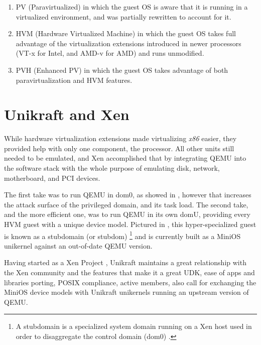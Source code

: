 \begin{enumerate}
  \item PV (Paravirtualized) in which the guest OS is aware that it is running in a virtualized environment, and was partially rewritten to account for it.
  \item HVM (Hardware Virtualized Machine) in which the guest OS takes full advantage of the virtualization extensions introduced in newer processors (VT-x for Intel, and AMD-v for AMD) and runs unmodified.
  \item PVH (Enhanced PV) in which the guest OS takes advantage of both paravirtualization and HVM features.
\end{enumerate}

\section{Unikraft and Xen}
\label{sec:unikraft-xen}

While hardware virtualization extensions made virtualizing \textit{x86} easier, they provided help with only one component, the processor.
All other units still needed to be emulated, and Xen accomplished that by integrating QEMU into the software stack with the whole purpose of emulating disk, network, motherboard, and PCI devices.

The first take was to run QEMU in dom0, as showed in  , however that increases the attack surface of the privileged domain, and its task load.
The second take, and the more efficient one, was to run QEMU in its own domU, providing every HVM guest with a unique device model.
Pictured in , this hyper-specialized guest is known as a stubdomain (or stubdom) \footnote{A stubdomain is a specialized system domain running on a Xen host used in order to disaggregate the control domain (dom0) \cite{xen-stubdomain}.} and is currently built as a MiniOS \cite{minios} unikernel against an out-of-date QEMU version.


Having started as a Xen Project \cite{unikraft-xen}, Unikraft maintains a great relationship with the Xen community and the features that make it a great UDK, ease of apps and libraries porting, POSIX compliance, active members, also call for exchanging the MiniOS device models with Unikraft unikernels running an upstream version of QEMU.

